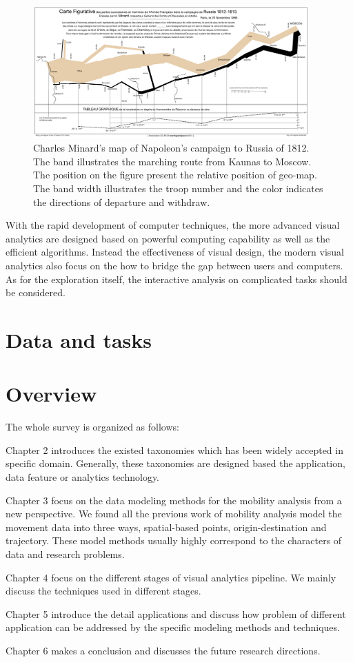 \begin{figure}[!htb]
  \centering
  \includegraphics[width = 400px]{figures/Napoleon_war.png}
  \caption{Charles Minard's map of Napoleon’s campaign to Russia of 1812. The band illustrates the marching route from Kaunas to Moscow. The position on the figure present the relative position of geo-map. The band width illustrates the troop number and the color indicates the directions of departure and withdraw. }
  \label{fig:napoleon}
\end{figure}

With the rapid development of computer techniques, the more advanced visual analytics are designed based on powerful computing capability as well as the efficient algorithms. Instead the effectiveness of visual design, the modern visual analytics also focus on the how to bridge the gap between users and computers. As for the exploration itself, the interactive analysis on complicated tasks should be considered. 

\section{Data and tasks}



\section{Overview}


The whole survey is organized as follows: 

Chapter 2 introduces the existed taxonomies which has been widely accepted in specific domain. Generally, these taxonomies are designed based the application, data feature or analytics technology.

Chapter 3 focus on the data modeling methods for the mobility analysis from a new perspective. We found all the previous work of mobility analysis model the movement data into three ways, spatial-based points, origin-destination and trajectory. These model methods usually highly correspond to the characters of data and research problems. 

Chapter 4 focus on the different stages of visual analytics pipeline. We mainly discuss the techniques used in different stages. 

Chapter 5 introduce the detail applications and discuss how problem of different application can be addressed by the specific modeling methods and techniques. 

Chapter 6 makes a conclusion and discusses the future research directions.

